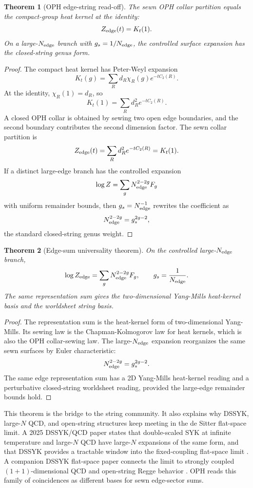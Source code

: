 \documentclass[11pt]{article}
\newtheorem{theorem}{Theorem}[section]
\theoremstyle{remark}
\theoremstyle{plain}
\begin{document}
\begin{theorem}[OPH edge-string read-off]
The sewn OPH collar partition equals the compact-group heat kernel at the identity:
\[
Z_{\rm edge}(t)=K_t(1).
\]
On a large-\(N_{\rm edge}\) branch with \(g_s=1/N_{\rm edge}\), the controlled surface expansion
has the closed-string genus form.
\end{theorem}

\begin{proof}
The compact heat kernel has Peter-Weyl expansion
\[
K_t(g)=\sum_R d_R\chi_R(g)e^{-tC_2(R)}.
\]
At the identity, \(\chi_R(1)=d_R\), so
\[
K_t(1)=\sum_R d_R^2e^{-tC_2(R)}.
\]
A closed OPH collar is obtained by sewing two open edge boundaries, and the second boundary
contributes the second dimension factor. The sewn collar partition is
\[
Z_{\rm edge}(t)=\sum_R d_R^2e^{-tC_2(R)}=K_t(1).
\]
If a distinct large-edge branch has the controlled expansion
\[
\log Z=\sum_g N_{\rm edge}^{2-2g}F_g
\]
with uniform remainder bounds, then \(g_s=N_{\rm edge}^{-1}\) rewrites the coefficient as
\[
N_{\rm edge}^{2-2g}=g_s^{2g-2},
\]
the standard closed-string genus weight.
\end{proof}

\begin{theorem}[Edge-sum universality theorem]
On the controlled large-\(N_{\rm edge}\) branch,
\[
\log Z_{\rm edge}
=
\sum_g N_{\rm edge}^{2-2g}F_g,
\qquad
g_s=\frac1{N_{\rm edge}}.
\]
The same representation sum gives the two-dimensional Yang-Mills heat-kernel basis and the
worldsheet string basis.
\end{theorem}

\begin{proof}
The representation sum is the heat-kernel form of two-dimensional Yang-Mills. Its sewing law is the
Chapman-Kolmogorov law for heat kernels, which is also the OPH collar-sewing law. The
large-\(N_{\rm edge}\) expansion reorganizes the same sewn surfaces by Euler characteristic:
\[
N_{\rm edge}^{2-2g}=g_s^{2g-2}.
\]
The same edge representation sum has a 2D Yang-Mills heat-kernel reading and a perturbative
closed-string worldsheet reading, provided the large-edge remainder bounds hold.
\end{proof}

This theorem is the bridge to the string community. It also explains why DSSYK, large-\(N\) QCD,
and open-string structures keep meeting in the de Sitter flat-space limit. A 2025 DSSYK/QCD paper
states that double-scaled SYK at infinite temperature and large-\(N\) QCD have large-\(N\)
expansions of the same form, and that DSSYK provides a tractable window into the fixed-coupling
flat-space limit \cite{DSSYKQCDPaper}. A companion DSSYK flat-space paper connects the limit to
strongly coupled \((1+1)\)-dimensional QCD and open-string Regge behavior \cite{DSSYKFlatPaper}.
OPH reads this family of coincidences as different bases for sewn edge-sector sums.
\end{document}
